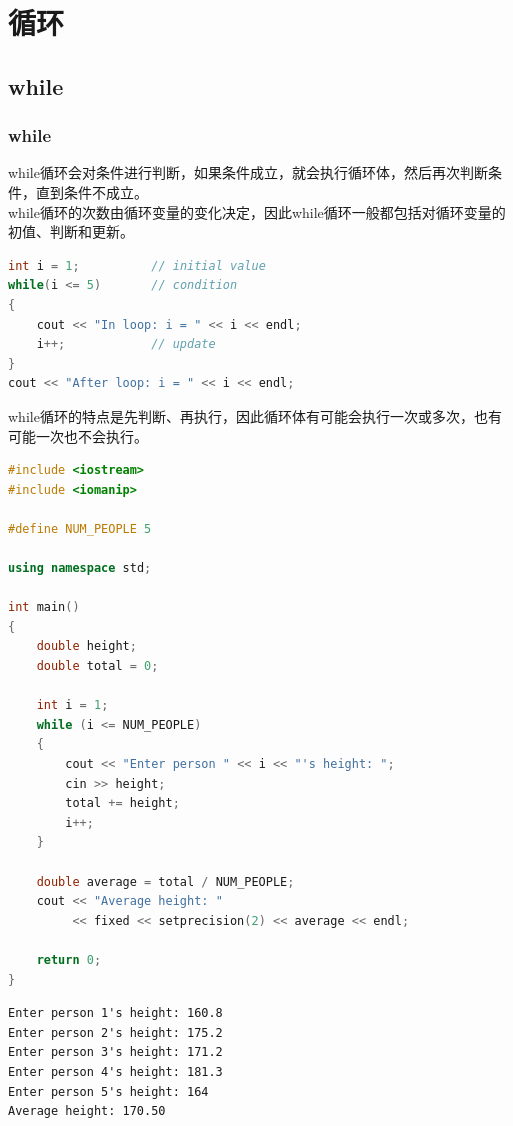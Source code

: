 \chapter{循环}

\section{while}

\subsection{while}

while循环会对条件进行判断，如果条件成立，就会执行循环体，然后再次判断条件，直到条件不成立。\\

while循环的次数由循环变量的变化决定，因此while循环一般都包括对循环变量的初值、判断和更新。

\vspace{-0.5cm}

\begin{lstlisting}[language=C++]
int i = 1;          // initial value
while(i <= 5)       // condition
{
    cout << "In loop: i = " << i << endl;
    i++;            // update
}
cout << "After loop: i = " << i << endl;
\end{lstlisting}

while循环的特点是先判断、再执行，因此循环体有可能会执行一次或多次，也有可能一次也不会执行。\\


\begin{lstlisting}[language=C++]
#include <iostream>
#include <iomanip>

#define NUM_PEOPLE 5

using namespace std;

int main()
{
    double height;
    double total = 0;

    int i = 1;
    while (i <= NUM_PEOPLE)
    {
        cout << "Enter person " << i << "'s height: ";
        cin >> height;
        total += height;
        i++;
    }

    double average = total / NUM_PEOPLE;
    cout << "Average height: "
         << fixed << setprecision(2) << average << endl;
    
    return 0;
}
\end{lstlisting}

\begin{tcolorbox}
    \begin{verbatim}
Enter person 1's height: 160.8
Enter person 2's height: 175.2
Enter person 3's height: 171.2
Enter person 4's height: 181.3
Enter person 5's height: 164
Average height: 170.50
\end{verbatim}
\end{tcolorbox}

